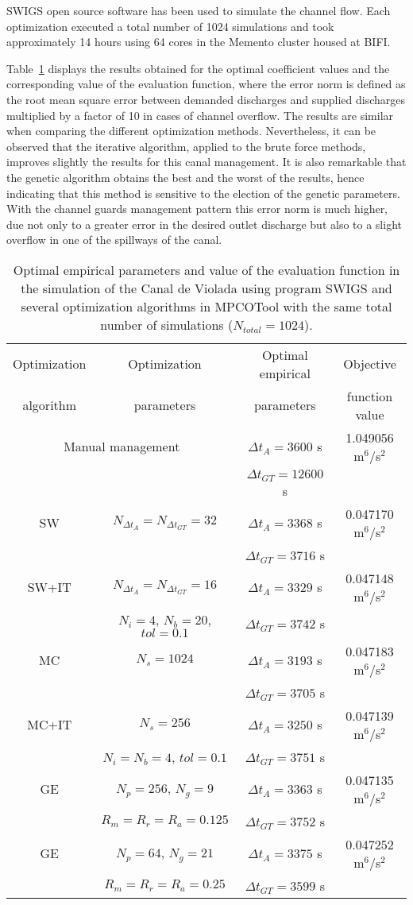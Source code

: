 \documentclass[review,authoryear]{elsarticle}
\newcommand{\TABLE}[5]
{
	\begin{table}[ht!]
		\centering
		\caption{#4.\label{#5}}
		#1
		\begin{tabular}{#2}
			#3
		\end{tabular}
	\end{table}
}
\begin{document}
SWIGS open source software \citep{Swigs} has been used to simulate the channel
flow. Each optimization executed a total number of 1024 simulations and took 
approximately 14 hours using 64 cores in the Memento cluster housed at BIFI.

Table~\ref{TabSwigs} displays the results obtained for the optimal coefficient
values and the corresponding value of the evaluation function, where the error
norm is defined as the root mean square error between demanded discharges and
supplied discharges multiplied by a factor of 10 in cases of channel overflow.
The results are similar when comparing the different optimization methods.
Nevertheless, it can be observed that the iterative algorithm, applied to the 
brute force methods, improves slightly the results for this canal management.
It is also remarkable that the genetic algorithm obtains the best
and the worst of the results, hence indicating that this method
is sensitive to the election of the genetic parameters. With the channel
guards management pattern this error norm is much higher, due not only to a greater error
in the desired outlet discharge but also to a slight overflow in one of the 
spillways of the canal.

\TABLE{\scriptsize}{cccc}
{
	Optimization & Optimization & Optimal empirical & Objective
	\\ algorithm & parameters & parameters & function value
	\\ \hline
	\multicolumn{2}{c}{Manual management} & $\Delta t_A=3600$ s
	& 1.049056 m$^6$/s$^2$
	\\ & & $\Delta t_{GT}=12600$ s
	\\ \hline
	SW & $N_{\Delta t_A}=N_{\Delta t_{GT}}=32$ & $\Delta t_A=3368$ s
	& 0.047170 m$^6$/s$^2$
	\\ & & $\Delta t_{GT}=3716$ s
	\\ \hline
	SW+IT & $N_{\Delta t_A}=N_{\Delta t_{GT}}=16$ & $\Delta t_A=3329$ s
	& 0.047148 m$^6$/s$^2$
	\\ & $N_i=4$, $N_b=20$, $tol=0.1$ & $\Delta t_{GT}=3742$ s
	\\ \hline
	MC & $N_s=1024$ & $\Delta t_A=3193$ s & 0.047183 m$^6$/s$^2$
	\\ & & $\Delta t_{GT}=3705$ s
	\\ \hline
	MC+IT & $N_s=256$ & $\Delta t_A=3250$ s & 0.047139 m$^6$/s$^2$
	\\ & $N_i=N_b=4$, $tol=0.1$ & $\Delta t_{GT}=3751$ s
	\\ \hline
	GE & $N_p=256$, $N_g=9$ & $\Delta t_A=3363$ s & 0.047135 m$^6$/s$^2$
	\\ & $R_m=R_r=R_a=0.125$ & $\Delta t_{GT}=3752$ s
	\\ \hline
	GE & $N_p=64$, $N_g=21$ & $\Delta t_A=3375$ s & 0.047252 m$^6$/s$^2$
	\\ & $R_m=R_r=R_a=0.25$ & $\Delta t_{GT}=3599$ s
	\\ \hline
}{Optimal empirical parameters and value of the evaluation function in the simulation of the Canal de Violada using program SWIGS and several optimization algorithms in MPCOTool with the same total number of simulations ($N_{total}=1024$)}
{TabSwigs}
\end{document}
